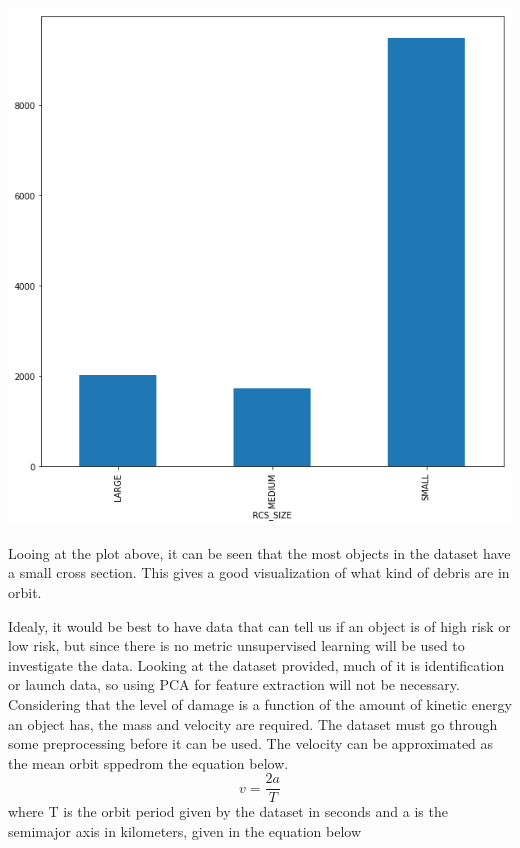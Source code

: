 \documentclass[12pt,a4paper]{article}
\begin{document}
\begin{center}
	\includegraphics[scale=0.2]{figures/RCS_size.png}
	\label{fig:RCS_size}
\end{center}
Looing at the plot above, it can be seen that the most objects in the dataset have a small cross section. This gives a good visualization of what kind of debris are in orbit. 

Idealy, it would be best to have data that can tell us if an object is of high risk or low risk, but since there is no metric unsupervised learning will be used to investigate the data. Looking at the dataset provided, much of it is identification or launch data, so using PCA for feature extraction will not be necessary. Considering that the level of damage is a function of the amount of kinetic energy an object has, the mass and velocity are required. 
The dataset must go through some preprocessing before it can be used. The velocity can be approximated as the mean orbit sppedrom the equation below.
\begin{equation}
v = \frac{2a}{T}
\end{equation}
where T is the orbit period given by the dataset in seconds and a is the semimajor axis in kilometers, given in the equation below
\end{document}
